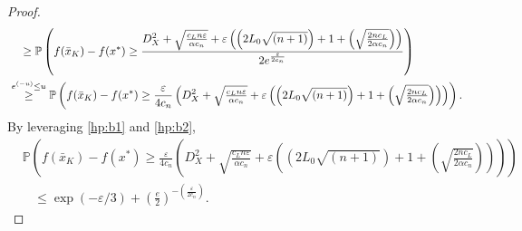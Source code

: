 \documentclass[11pt,reqno]{amsart}
\newcommand{\1}{{\bf 1}}
\newcommand{\2}{{\bf 2}}
\newcommand{\us}[1]{\textcolor{red}{#1}}
\newcommand{\al}{\alpha}
\numberwithin{equation}{section}
\theoremstyle{remark}
\begin{document}
{\begin{proof}
{\begin{align}
			\notag    &~~~\ge 
			\mathbb{P}\left(f(\bar{x}_K)-f(x^*)\geq \frac{D_X^2 +\sqrt{\frac{c_Ln\varepsilon}{\al c_n}}+ \varepsilon\left(\left(2 L_0\sqrt{(n+1)}\right)+1+ \left(\sqrt{\frac{2nc_L}{2\al c_n}}\right)\right)}{2e^{\frac{\varepsilon}{2c_n}}}\right) \\
			\label{hp:b2}    &\overset{e^{(-u)} \le u}{\ge} 
			\mathbb{P}\left(f(\bar{x}_K)-f(x^*)\geq \frac{\varepsilon}{4c_n}\left(D_X^2 +\sqrt{\tfrac{c_Ln\varepsilon}{\al c_n}}+ \varepsilon\left(\left(2 L_0\sqrt{(n+1)}\right)+1+ \left(\sqrt{\tfrac{2nc_L}{2\al c_n}}\right)\right)\right)\right). 
		\end{align}}
		{By leveraging \eqref{hp:b1} and \eqref{hp:b2},}
		\begin{align*}
			& \mathbb{P}\left(f(\bar{x}_K)-f(x^*)\geq \frac{\varepsilon}{4c_n}\left(D_X^2 +\sqrt{\tfrac{c_Ln\varepsilon}{\al c_n}}+ \varepsilon\left(\left(2 L_0\sqrt{(n+1)}\right)+1+ \left(\sqrt{\tfrac{2nc_L}{2\al c_n}}\right)\right)\right)\right) \\
			&~~~~\le \exp\left(-\varepsilon/3\right)+\left(\frac{e}{2}\right)^{-(\frac{\varepsilon}{2c_n})}. 
		\end{align*}
		

\end{proof}}
\end{document}
